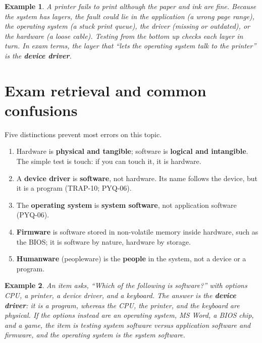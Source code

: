\documentclass[11pt]{article}
\newtheorem{example}{Example}[section]
\begin{document}
\begin{example}
A printer fails to print although the paper and ink are fine. Because the
system has layers, the fault could lie in the application (a wrong page range),
the operating system (a stuck print queue), the driver (missing or outdated),
or the hardware (a loose cable). Testing from the bottom up checks each layer
in turn. In exam terms, the layer that ``lets the operating system talk to the
printer'' is the \textbf{device driver}.
\end{example}

\section{Exam retrieval and common confusions}
Five distinctions prevent most errors on this topic.
\begin{enumerate}
  \item Hardware is \textbf{physical and tangible}; software is
    \textbf{logical and intangible}. The simple test is touch: if you can
    touch it, it is hardware.
  \item A \textbf{device driver} is \textbf{software}, not hardware. Its name
    follows the device, but it is a program (TRAP-10; PYQ-06).
  \item The \textbf{operating system} is \textbf{system software}, not
    application software (PYQ-06).
  \item \textbf{Firmware} is software stored in non-volatile memory inside
    hardware, such as the BIOS; it is software by nature, hardware by storage.
  \item \textbf{Humanware} (peopleware) is the \textbf{people} in the system,
    not a device or a program.
\end{enumerate}

\begin{example}
An item asks, ``Which of the following is software?'' with options CPU, a
printer, a device driver, and a keyboard. The answer is the \textbf{device
driver}: it is a program, whereas the CPU, the printer, and the keyboard are
physical. If the options instead are an operating system, MS Word, a BIOS
chip, and a game, the item is testing system software versus application
software and firmware, and the operating system is the system software.
\end{example}
\end{document}
